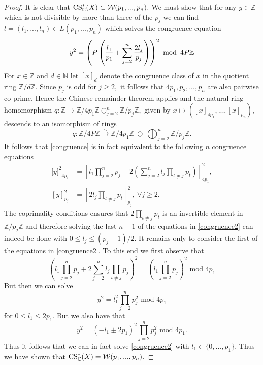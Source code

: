 \begin{proof} It is clear that $\operatorname{CS}_{\mathbb{C}}^*(X) \subset \mathcal{W}(p_1,...,p_n).$ We must show that for any $y \in \mathbb{Z}$ which is not divisible by more than  three of the $p_j$ we can find $l=(l_1,...,l_n) \in L(p_1,...,p_n)$  which solves the congruence equation
\begin{equation} \label{congruence}
y^2 = \left(P\left( \frac{l_1}{p_1}+\sum_{j=2}^{n} \frac{2 l_j}{p_j}\right) \right)^2 \  \operatorname{mod} \ 4P\mathbb{Z}
\end{equation} 
For $x \in \mathbb{Z}$ and $d \in \mathbb{N}$ let $[x]_d$ denote the congruence class of $x$ in the quotient ring $\mathbb{Z} / d\mathbb{Z}.$ Since $p_j$ is odd for $j\geq 2,$ it follows that $4p_1,p_2,...,p_n$ are also pairwise co-prime. Hence the Chinese remainder theorem applies and the natural ring homomorphism $q:\mathbb{Z} \rightarrow \mathbb{Z}/4p_1\mathbb{Z} \oplus_{j=2}^n \mathbb{Z}/p_j\mathbb{Z},$ given by $x \mapsto ([x]_{4p_1},...,[x]_{p_n}),$ descends to an isomorphism of rings 
$$\overline{q}: \mathbb{Z}/4P\mathbb{Z} \overset{\sim}{\rightarrow} \mathbb{Z}/4p_1\mathbb{Z} \ \oplus \ \bigoplus_{j=2}^n \mathbb{Z}/p_j\mathbb{Z} .$$
 It follows that \eqref{congruence} is in fact equivalent to the following $n$ congruence equations
\begin{align}\label{congruence2}
[{y]^2}_{4p_1}&=\left[l_1\prod_{j=2}^n p_j+2\left(\sum_{j=2}^{n} l_j \prod_{t\not=j} p_t\right)\right]^2_{4p_1}, 
\\ [y]^2_{p_j}&=\left[2l_j \prod_{t\not=j}p_t \right]^2_{p_j}, \ \forall j\geq 2.
\end{align} The coprimality conditions ensures that $2\prod_{t\not=j} p_t$ is an invertible element in $\mathbb{Z}/p_j\mathbb{Z}$ and therefore solving the last $n-1$ of the equations in \eqref{congruence2} can indeed be done with $0 \leq l_j\leq (p_j-1)/2.$ 
It remains only to consider the first of the equations in \eqref{congruence2}. To this end we first observe that
$$ \left( l_1 \prod_{j=2}^n p_j + 2 \sum_{j=2}^n l_j  \prod_{t\neq j} p_j\right)^2 = \left( l_1 \prod_{j=2}^n p_j \right)^2 \text{ mod } 4 p_1$$
But then we can solve
$$ y^2 = l_1^2 \prod_{j=2}^n p^2_j \text{ mod } 4 p_1$$
for $0 \leq l_1 \leq 2p_1$. But we also have that
$$ y^2 = (-l_1 \pm 2 p_1)^2 \prod_{j=2}^n p_j^2\text{ mod } 4 p_1.$$
Thus it follows that we can in fact solve  \eqref{congruence2} with $l_1\in \{0,...,p_1\}.$ 
 Thus we have shown that $\operatorname{CS}_{\mathbb{C}}^*(X) = \mathcal{W}(p_1,...,p_n).$  \end{proof}

